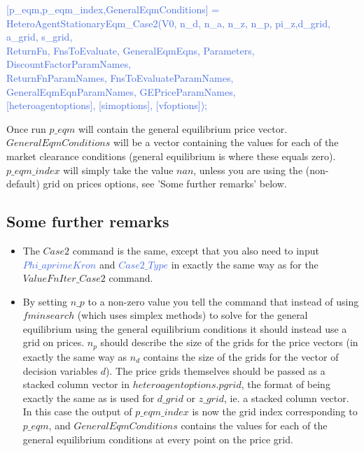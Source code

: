 \textcolor{RoyalBlue}{[p\_{}eqm,p\_{}eqm\_{}index,GeneralEqmConditions] =} \\
\indent \textcolor{RoyalBlue}{  HeteroAgentStationaryEqm\_{}Case2(V0, n\_{}d, n\_{}a, n\_{}z, n\_{}p, pi\_{}z,d\_{}grid, a\_{}grid, s\_{}grid,} \\
\indent \indent \textcolor{RoyalBlue}{   ReturnFn, FnsToEvaluate, GeneralEqmEqns, Parameters, DiscountFactorParamNames, } \\
\indent \indent \textcolor{RoyalBlue}{   ReturnFnParamNames, FnsToEvaluateParamNames, GeneralEqmEqnParamNames, GEPriceParamNames,} \\
\indent \indent \textcolor{RoyalBlue}{   [heteroagentoptions], [simoptions], [vfoptions]);}

Once run $p\_{}eqm$ will contain the general equilibrium price vector. $GeneralEqmConditions$ will be a vector containing the values for each of the market
clearance conditions (general equilibrium is where these equals zero).
$p\_{}eqm\_{}index$ will simply take the value $nan$, unless you are using the
(non-default) grid on prices options, see 'Some further remarks' below.


\subsection{Some further remarks}
\begin{itemize}
 \item The $Case2$ command is the same, except that you also need to input \textcolor{RoyalBlue}{$Phi\_{}aprimeKron$} and \textcolor{RoyalBlue}{$Case2\_{}Type$}
   in exactly the same way as for the $ValueFnIter\_{}Case2$ command.
 \item By setting $n\_{}p$ to a non-zero value you tell the command that instead of using $fminsearch$ (which uses simplex methods) to solve
   for the general equilibrium using the general equilibrium conditions it should instead use a grid on prices. $n_p$ should describe the size of
   the grids for the price vectors (in exactly the same way as $n_d$ contains the size of the grids for the vector of decision variables $d$).
   The price grids themselves should be passed as a stacked column vector in $heteroagentoptions.pgrid$, the format of being exactly the same
   as is used for $d\_{}grid$ or $z\_{}grid$, ie. a stacked column vector. In this case the output of $p\_{}eqm\_{}index$ is now the grid
   index corresponding to $p\_{}eqm$, and $GeneralEqmConditions$ contains the values for each of the general equilibrium conditions at every point
   on the price grid.
\end{itemize}

